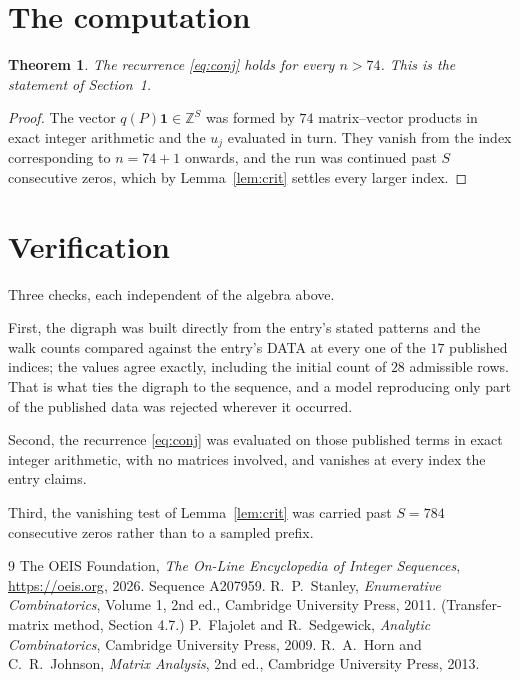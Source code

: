 \documentclass[11pt,a4paper]{article}
\theoremstyle{plain}
\newtheorem{theorem}{Theorem}
\theoremstyle{definition}
\begin{document}
\section{The computation}

\begin{theorem}
The recurrence \eqref{eq:conj} holds for every $n>74$. This is the statement of
Section~1.
\end{theorem}

\begin{proof}
The vector $q(P)\mathbf{1}\in\mathbb{Z}^{S}$ was formed by $74$ matrix--vector
products in exact integer arithmetic and the $u_j$ evaluated in turn. They vanish from the
index corresponding to $n=74+1$ onwards, and the run was continued past $S$ consecutive
zeros, which by Lemma~\ref{lem:crit} settles every larger index.
\end{proof}

\section{Verification}

Three checks, each independent of the algebra above.

First, the digraph was built directly from the entry's stated patterns and the walk counts
compared against the entry's DATA at every one of the $17$ published indices; the
values agree exactly, including the initial count of $28$ admissible rows. That is
what ties the digraph to the sequence, and a model reproducing only part of the published
data was rejected wherever it occurred.

Second, the recurrence \eqref{eq:conj} was evaluated on those published terms in exact
integer arithmetic, with no matrices involved, and vanishes at every index the entry claims.

Third, the vanishing test of Lemma~\ref{lem:crit} was carried past $S=784$ consecutive
zeros rather than to a sampled prefix.

\begin{thebibliography}{9}
 The OEIS Foundation, \emph{The On-Line Encyclopedia of Integer
Sequences}, \url{https://oeis.org}, 2026. Sequence A207959.
 R.~P.~Stanley, \emph{Enumerative Combinatorics}, Volume 1, 2nd ed.,
Cambridge University Press, 2011. (Transfer-matrix method, Section 4.7.)
 P.~Flajolet and R.~Sedgewick, \emph{Analytic Combinatorics}, Cambridge
University Press, 2009.
 R.~A.~Horn and C.~R.~Johnson, \emph{Matrix Analysis}, 2nd ed., Cambridge
University Press, 2013.
\end{thebibliography}
\end{document}
